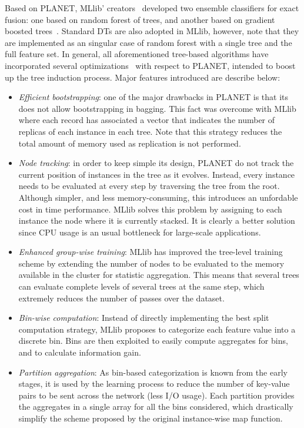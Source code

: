 \documentclass[3p,review]{elsarticle}
\begin{document}
	Based on PLANET, MLlib' creators~\cite{mllib15} developed two ensemble classifiers for exact fusion: one based on random forest of trees, and another based on gradient boosted trees~\cite{mllibtrees}. Standard DTs are also adopted in MLlib, however, note that they are implemented as an singular case of random forest with a single tree and the full feature set. In general, all aforementioned tree-based algorithms have incorporated several optimizations~\cite{mllibdt} with respect to PLANET, intended to boost up the tree induction process. Major features introduced are describe below:
	
	\begin{itemize}
		\item \textit{Efficient bootstrapping}: one of the major drawbacks in PLANET is that its does not allow bootstrapping in bagging. This fact was overcome with MLlib where each record has associated a vector that indicates the number of replicas of each instance in each tree. Note that this strategy reduces the total amount of memory used as replication is not performed.
		\item \textit{Node tracking}: in order to keep simple its design, PLANET do not track the current position of instances in the tree as it evolves. Instead, every instance needs to be evaluated at every step by traversing the tree from the root. Although simpler, and less memory-consuming, this introduces an unfordable cost in time performance. MLlib solves this problem by assigning to each instance the node where it is currently stacked. It is clearly a better solution since CPU usage is an usual bottleneck for large-scale applications.
		\item \textit{Enhanced group-wise training}: MLlib has improved the tree-level training scheme by extending the number of nodes to be evaluated to the memory available in the cluster for statistic aggregation. This means that several trees can evaluate complete levels of several trees at the same step, which extremely reduces the number of passes over the dataset.
		\item \textit{Bin-wise computation}: Instead of directly implementing the best split computation strategy, MLlib proposes to categorize each feature value into a discrete bin. Bins are then exploited to easily compute aggregates for bins, and to calculate information gain. 
		\item \textit{Partition aggregation}: As bin-based categorization is known from the early stages, it is used by the learning process to reduce the number of key-value pairs to be sent across the network (less I/O usage). Each partition provides the aggregates in a single array for all the bins considered, which drastically simplify the scheme proposed by the original instance-wise map function.
	\end{itemize}
	
\end{document}
